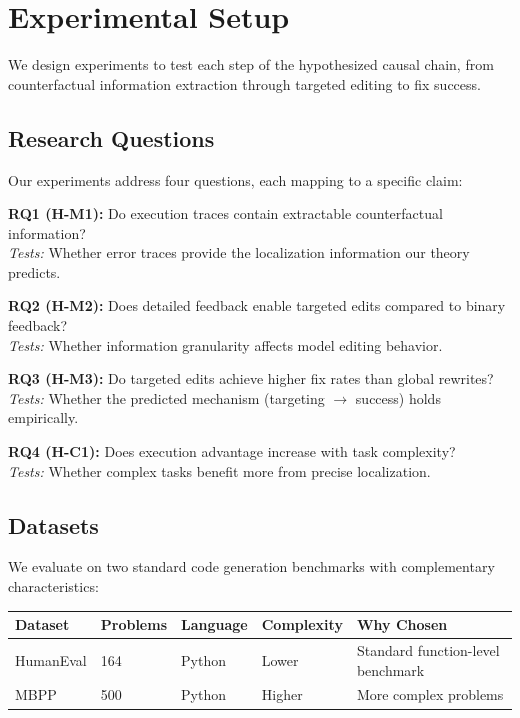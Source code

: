 \section{Experimental Setup}
\label{sec:experiments}

We design experiments to test each step of the hypothesized causal chain, from counterfactual information extraction through targeted editing to fix success.

\subsection{Research Questions}

Our experiments address four questions, each mapping to a specific claim:

\textbf{RQ1 (H-M1):} Do execution traces contain extractable counterfactual information?\\
\emph{Tests:} Whether error traces provide the localization information our theory predicts.

\textbf{RQ2 (H-M2):} Does detailed feedback enable targeted edits compared to binary feedback?\\
\emph{Tests:} Whether information granularity affects model editing behavior.

\textbf{RQ3 (H-M3):} Do targeted edits achieve higher fix rates than global rewrites?\\
\emph{Tests:} Whether the predicted mechanism (targeting $\rightarrow$ success) holds empirically.

\textbf{RQ4 (H-C1):} Does execution advantage increase with task complexity?\\
\emph{Tests:} Whether complex tasks benefit more from precise localization.

\subsection{Datasets}

We evaluate on two standard code generation benchmarks with complementary characteristics:

\begin{table}[h]
\centering
\begin{tabular}{@{}lllll@{}}
\toprule
\textbf{Dataset} & \textbf{Problems} & \textbf{Language} & \textbf{Complexity} & \textbf{Why Chosen} \\
\midrule
HumanEval & 164 & Python & Lower & Standard function-level benchmark \\
MBPP & 500 & Python & Higher & More complex problems \\
\bottomrule
\end{tabular}
\end{table}


